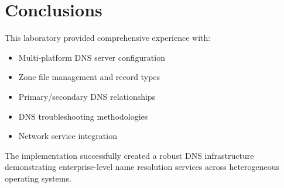 \documentclass[12pt,a4paper]{article}
\begin{document}
\section{Conclusions}

This laboratory provided comprehensive experience with:
\begin{itemize}
    \item Multi-platform DNS server configuration
    \item Zone file management and record types
    \item Primary/secondary DNS relationships
    \item DNS troubleshooting methodologies
    \item Network service integration
\end{itemize}

The implementation successfully created a robust DNS infrastructure demonstrating enterprise-level name resolution services across heterogeneous operating systems.
\end{document}
